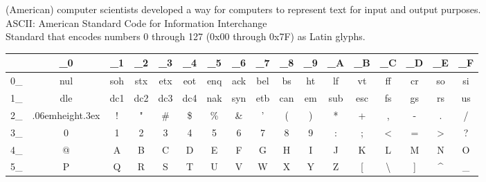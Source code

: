 \documentclass[smaller,xcolor=table,aspectratio=169]{beamer}
\newcommand\Vtextvisiblespace[1][.3em]{%
  \mbox{\kern.06em\vrule height.3ex}%
  \vbox{\hrule width#1}%
  \hbox{\vrule height.3ex}}
\begin{document}
						\newcommand{\CNT}{\cellcolor{mathematica green!25}}
						\newcommand{\ALP}{\cellcolor{mathematica orange!25}}
						\newcommand{\PUN}{\cellcolor{mathematica purple!25}}
						\begin{frame}[plain]
							(American) computer scientists developed a way for computers to represent text for input and output purposes.\\
							ASCII: American Standard Code for Information Interchange\\
							Standard that encodes numbers 0 through 127 (0x00 through 0x7F) as Latin glyphs.\\
							\begin{table}
								\tiny\ttfamily
								\begin{tabular}{r|c|c|c|c|c|c|c|c|c|c|c|c|c|c|c|c}
									    & \_0                     & \_1      & \_2      & \_3      & \_4      & \_5      & \_6      & \_7      & \_8      & \_9     & \_A      & \_B      & \_C                 & \_D     & \_E                   & \_F      \\ \hline
									0\_ & \CNT nul                & \CNT soh & \CNT stx & \CNT etx & \CNT eot & \CNT enq & \CNT ack & \CNT bel & \CNT bs  & \CNT ht & \CNT lf  & \CNT vt  & \CNT ff             & \CNT cr & \CNT so               & \CNT si  \\
									1\_ & \CNT dle                & \CNT dc1 & \CNT dc2 & \CNT dc3 & \CNT dc4 & \CNT nak & \CNT syn & \CNT etb & \CNT can & \CNT em & \CNT sub & \CNT esc & \CNT fs             & \CNT gs & \CNT rs               & \CNT us  \\
									2\_ & \PUN \Vtextvisiblespace & \PUN !   & \PUN "   & \PUN \#  & \PUN \$  & \PUN \%  & \PUN \&  & \PUN '   & \PUN (   & \PUN )  & \PUN *   & \PUN +   & \PUN ,              & \PUN -  & \PUN .                & \PUN /   \\
									3\_ & \ALP 0                  & \ALP 1   & \ALP 2   & \ALP 3   & \ALP 4   & \ALP 5   & \ALP 6   & \ALP 7   & \ALP 8   & \ALP 9  & \PUN :   & \PUN ;   & \PUN <              & \PUN =  & \PUN >                & \PUN ?   \\
									4\_ & \PUN @                  & \ALP A   & \ALP B   & \ALP C   & \ALP D   & \ALP E   & \ALP F   & \ALP G   & \ALP H   & \ALP I  & \ALP J   & \ALP K   & \ALP L              & \ALP M  & \ALP N                & \ALP O   \\
									5\_ & \ALP P                  & \ALP Q   & \ALP R   & \ALP S   & \ALP T   & \ALP U   & \ALP V   & \ALP W   & \ALP X   & \ALP Y  & \ALP Z   & \PUN [   & \PUN \textbackslash & \PUN ]  & \PUN \textasciicircum & \PUN \_  \\

\end{tabular}
\end{table}
\end{frame}
\end{document}
